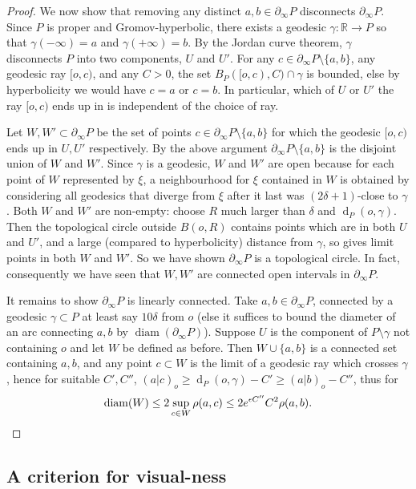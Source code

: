 \documentclass[11pt,a4paper]{amsart}
\DeclareMathOperator{\diam}{diam}
\DeclareMathOperator{\dist}{d}
\newcommand{\bdry}{\partial_\infty}
\newcommand{\R}{\mathbb{R}}
\theoremstyle{definition}
\begin{document}
\begin{proof}
	We now show that removing any distinct $a,b \in \bdry P$ disconnects $\bdry P$.
	Since $P$ is proper and Gromov-hyperbolic, there exists a geodesic $\gamma:\R\to P$ so that $\gamma(-\infty)=a$ and $\gamma(+\infty)=b$.
	By the Jordan curve theorem, $\gamma$ disconnects $P$ into two components, $U$ and $U'$.
	For any $c \in \bdry P \setminus \{a,b\}$, any geodesic ray $[o,c)$, and any $C>0$, the set $B_P([o,c),C)\cap \gamma$ is bounded, else by hyperbolicity we would have $c=a$ or $c=b$.  In particular, which of $U$ or $U'$ the ray $[o,c)$ ends up in is independent of the choice of ray.

	Let $W,W' \subset \bdry P$ be the set of points $c \in \bdry P \setminus \{a,b\}$ for which the geodesic $[o,c)$ ends up in $U, U'$ respectively.
	By the above argument $\bdry P \setminus \{a,b\}$ is the disjoint union of $W$ and $W'$.
	Since $\gamma$ is a geodesic, $W$ and $W'$ are open because for each point of $W$ represented by $\xi$, a neighbourhood for $\xi$ contained in $W$ is obtained by considering all geodesics that diverge from $\xi$ after it last was $(2\delta+1)$-close to $\gamma$.
	Both $W$ and $W'$ are non-empty: choose $R$ much larger than $\delta$ and $\dist_P(o,\gamma)$.  Then the topological circle outside $B(o,R)$ contains points which are in both $U$ and $U'$, and a large (compared to hyperbolicity) distance from $\gamma$, so gives limit points in both $W$ and $W'$.
	So we have shown $\bdry P$ is a topological circle.  In fact, consequently we have seen that $W,W'$ are connected open intervals in $\bdry P$.

	It remains to show $\bdry P$ is linearly connected.
	Take $a,b \in \bdry P$, connected by a geodesic $\gamma \subset P$ at least say $10\delta$ from $o$ (else it suffices to bound the diameter of an arc connecting $a,b$ by $\diam(\bdry P)$).
	Suppose $U$ is the component of $P \setminus \gamma$ not containing $o$ and let $W$ be defined as before.
	Then $W \cup \{a,b\}$ is a connected set containing $a,b$, and any point $c \subset W$ is the limit of a geodesic ray which crosses $\gamma$, hence for suitable $C',C''$, $(a|c)_o \geq \dist_P(o,\gamma)-C' \geq (a|b)_o -C''$, thus for 
	\[
		\diam(W) \leq 2\sup_{c \in W} \rho(a,c) \leq 2e^{\epsilon C''}C^2 \rho(a,b). \qedhere
	\]
\end{proof}



\subsection{A criterion for visual-ness}
\end{document}
